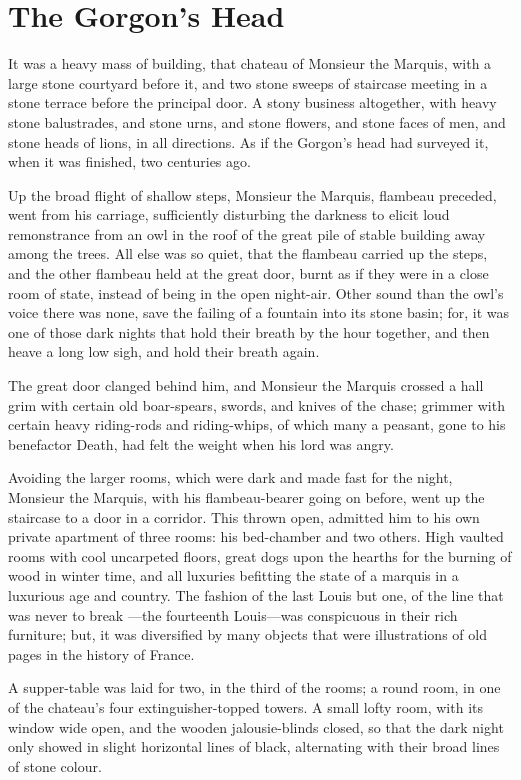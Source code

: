 \chapter{The Gorgon's Head}


It was a heavy mass of building, that chateau of Monsieur the Marquis,
with a large stone courtyard before it, and two stone sweeps of
staircase meeting in a stone terrace before the principal door.
A stony business altogether, with heavy stone balustrades, and stone
urns, and stone flowers, and stone faces of men, and stone heads of
lions, in all directions.  As if the Gorgon's head had surveyed it,
when it was finished, two centuries ago.

Up the broad flight of shallow steps, Monsieur the Marquis, flambeau
preceded, went from his carriage, sufficiently disturbing the darkness
to elicit loud remonstrance from an owl in the roof of the great pile
of stable building away among the trees.  All else was so quiet, that
the flambeau carried up the steps, and the other flambeau held at the
great door, burnt as if they were in a close room of state, instead
of being in the open night-air.  Other sound than the owl's voice
there was none, save the failing of a fountain into its stone basin;
for, it was one of those dark nights that hold their breath by the hour
together, and then heave a long low sigh, and hold their breath again.

The great door clanged behind him, and Monsieur the Marquis crossed
a hall grim with certain old boar-spears, swords, and knives of the
chase; grimmer with certain heavy riding-rods and riding-whips, of
which many a peasant, gone to his benefactor Death, had felt the
weight when his lord was angry.

Avoiding the larger rooms, which were dark and made fast for the
night, Monsieur the Marquis, with his flambeau-bearer going on before,
went up the staircase to a door in a corridor.  This thrown open,
admitted him to his own private apartment of three rooms:
his bed-chamber and two others.  High vaulted rooms with cool
uncarpeted floors, great dogs upon the hearths for the burning
of wood in winter time, and all luxuries befitting the state
of a marquis in a luxurious age and country.  The fashion
of the last Louis but one, of the line that was never to break%
---the fourteenth Louis---was conspicuous in their rich furniture;
but, it was diversified by many objects that were illustrations
of old pages in the history of France.

A supper-table was laid for two, in the third of the rooms; a round
room, in one of the chateau's four extinguisher-topped towers.
A small lofty room, with its window wide open, and the wooden
jalousie-blinds closed, so that the dark night only showed in slight
horizontal lines of black, alternating with their broad lines of
stone colour.

